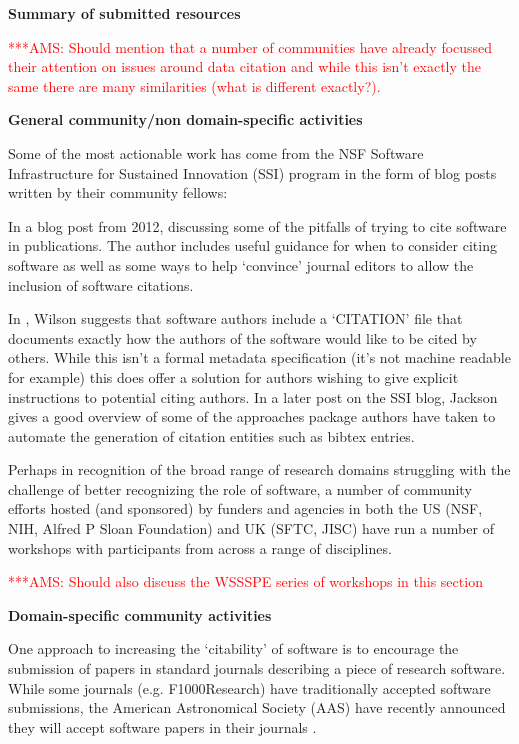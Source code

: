 \documentclass[11pt, oneside]{amsart}
\newcommand{\asnote}[1]{ {\textcolor{red} { ***AMS: #1 }}}
\begin{document}
\textbf{Summary of submitted resources}

\asnote{Should mention that a number of communities have already focussed their attention on issues around data citation and while
this isn't exactly the same there are many similarities (what is different exactly?).}

\textbf{General community/non domain-specific activities}

Some of the most actionable work has come from the NSF Software Infrastructure for Sustained Innovation (SSI) program in the form of blog posts written by their community fellows:

In a blog post from 2012, \cite{ssi-how-to-cite} discussing some of the pitfalls of trying to cite software in publications.
The author includes useful guidance for when to consider citing software as well as some ways to help `convince' journal editors
to allow the inclusion of software citations.

In \cite{ssi-citation-files}, Wilson suggests that software authors include a `CITATION' file that documents exactly how the
authors of the software would like to be cited by others. While this isn't a formal metadata specification (it's not machine
readable for example) this does offer a solution for authors wishing to give explicit instructions to potential citing authors.
In a later post on the SSI blog, Jackson \cite{ssi-how-shalt-i-cite-thee} gives a good overview of some of the approaches
package authors have taken to automate the generation of citation entities such as bibtex entries.

Perhaps in recognition of the broad range of research domains struggling with
the challenge of better recognizing the role of software, a number of community
efforts hosted (and sponsored) by funders and agencies in both the US (NSF,
NIH, Alfred P Sloan Foundation) and UK (SFTC, JISC) have run a number of
workshops with participants from across a range of disciplines.

\asnote{Should also discuss the WSSSPE \cite{wssspe} series of workshops in this section}

\textbf{Domain-specific community activities}

One approach to increasing the `citability' of software is to encourage the
submission of papers in standard journals describing a piece of research
software. While some journals (e.g. F1000Research) have traditionally accepted
software submissions, the American Astronomical Society (AAS) have recently
announced they will accept software papers in their journals
\cite{aas-sofware-papers}.
\end{document}
